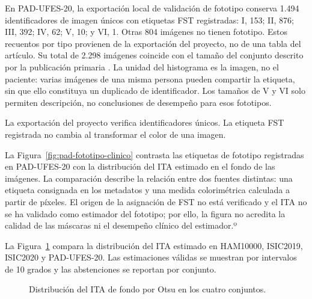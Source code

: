 En PAD-UFES-20, la exportación local de validación de fototipo conserva 1.494 identificadores de imagen únicos con etiquetas FST registradas: I, 153; II, 876; III, 392; IV, 62; V, 10; y VI, 1. Otras 804 imágenes no tienen fototipo. Estos recuentos por tipo provienen de la exportación del proyecto, no de una tabla del artículo. Su total de 2.298 imágenes coincide con el tamaño del conjunto descrito por la publicación primaria \parencite{pacheco2020padufes}. La unidad del histograma es la imagen, no el paciente: varias imágenes de una misma persona pueden compartir la etiqueta, sin que ello constituya un duplicado de identificador. Los tamaños de V y VI solo permiten descripción, no conclusiones de desempeño para esos fototipos.

La exportación del proyecto verifica identificadores únicos. La etiqueta FST registrada no cambia al transformar el color de una imagen.

La Figura~\ref{fig:pad-fototipo-clinico} contrasta las etiquetas de fototipo registradas en PAD-UFES-20 con la distribución del ITA estimado en el fondo de las imágenes. La comparación describe la relación entre dos fuentes distintas: una etiqueta consignada en los metadatos y una medida colorimétrica calculada a partir de píxeles. El origen de la asignación de FST no está verificado y el ITA no se ha validado como estimador del fototipo; por ello, la figura no acredita la calidad de las máscaras ni el desempeño clínico del estimador.º



La Figura~\ref{fig:ita-distribucion-multidataset} compara la distribución del ITA estimado en HAM10000, ISIC2019, ISIC2020 y PAD-UFES-20. Las estimaciones válidas se muestran por intervalos de 10 grados y las abstenciones se reportan por conjunto.

\begin{figure}[!htbp]
\caption{Distribución del ITA de fondo por Otsu en los cuatro conjuntos.}
\label{fig:ita-distribucion-multidataset}
\centering
\noindent\makebox[\linewidth][c]{}
\par\smallskip
\raggedright\fontsize{11}{13}\selectfont\singlespacing
\par{}
\end{figure}





